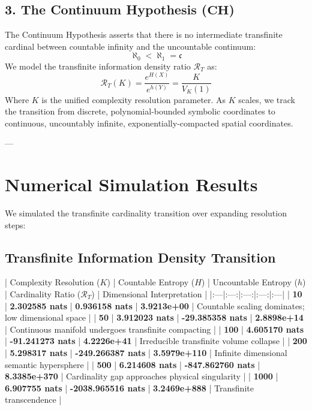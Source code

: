 \documentclass[11pt,twocolumn]{article}
\begin{document}
\subsection{3. The Continuum Hypothesis ($\mathbf{CH}$)}
The Continuum Hypothesis asserts that there is no intermediate transfinite cardinal between countable infinity and the uncountable continuum:
$$\aleph_0 < \aleph_1 = \mathfrak{c}$$
We model the transfinite information density ratio $\mathcal{R}_T$ as:
$$\mathcal{R}_T(K) = \frac{e^{H(X)}}{e^{h(Y)}} = \frac{K}{V_K(1)}$$
Where $K$ is the unified complexity resolution parameter. As $K$ scales, we track the transition from discrete, polynomial-bounded symbolic coordinates to continuous, uncountably infinite, exponentially-compacted spatial coordinates.

---

\section{Numerical Simulation Results}

We simulated the transfinite cardinality transition over expanding resolution steps:

\subsection{Transfinite Information Density Transition}

| Complexity Resolution ($K$) | Countable Entropy ($H$) | Uncountable Entropy ($h$) | Cardinality Ratio ($\mathcal{R}_T$) | Dimensional Interpretation |
|:---|:---:|:---:|:---:|:---|
| \textbf{10} | \textbf{2.302585 nats} | \textbf{0.936158 nats} | \textbf{3.9213e+00} | Countable scaling dominates; low dimensional space |
| \textbf{50} | \textbf{3.912023 nats} | \textbf{-29.385358 nats} | \textbf{2.8898e+14} | Continuous manifold undergoes transfinite compacting |
| \textbf{100} | \textbf{4.605170 nats} | \textbf{-91.241273 nats} | \textbf{4.2226e+41} | Irreducible transfinite volume collapse |
| \textbf{200} | \textbf{5.298317 nats} | \textbf{-249.266387 nats} | \textbf{3.5979e+110} | Infinite dimensional semantic hypersphere |
| \textbf{500} | \textbf{6.214608 nats} | \textbf{-847.862760 nats} | \textbf{8.3385e+370} | Cardinality gap approaches physical singularity |
| \textbf{1000} | \textbf{6.907755 nats} | \textbf{-2038.965516 nats} | \textbf{3.2469e+888} | Transfinite transcendence |
\end{document}
